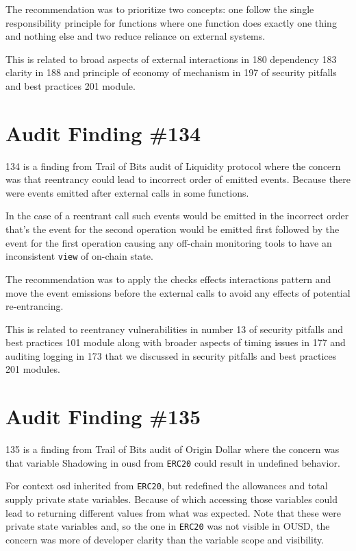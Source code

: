 The recommendation was to prioritize two concepts: one follow the single responsibility principle for functions where one function does exactly one thing and nothing else and two reduce reliance on external systems.

This is related to broad aspects of external interactions in 180 dependency 183 clarity in 188 and principle of economy of mechanism in 197 of security pitfalls and best practices 201 module.

\section{Audit Finding \#134}

134 is a finding from Trail of Bits audit of Liquidity protocol where the concern was that reentrancy could lead to incorrect order of emitted events. Because there were events emitted after external calls in some functions. 

In the case of a reentrant call such events would be emitted in the incorrect order that's the event for the second operation would be emitted first followed by the event for the first operation causing any off-chain monitoring tools to have an inconsistent \verb|view| of on-chain state.

The recommendation was to apply the checks effects interactions pattern and move the event emissions before the external calls to avoid any effects of potential re-entrancing.

This is related to reentrancy vulnerabilities in number 13 of security pitfalls and best practices 101 module along with broader aspects of timing issues in 177 and auditing logging in 173 that we discussed in security pitfalls and best practices 201 modules.

\section{Audit Finding \#135}

135 is a finding from Trail of Bits audit of Origin Dollar where the concern was that variable Shadowing in ousd from \verb|ERC20| could result in undefined behavior. 

For context osd inherited from \verb|ERC20|, but redefined the allowances and total supply private state variables. Because of which accessing those variables could lead to returning different values from what was expected. Note that these were private state variables and, so the one in \verb|ERC20| was not visible in OUSD, the concern was more of developer clarity than the variable scope and visibility.

